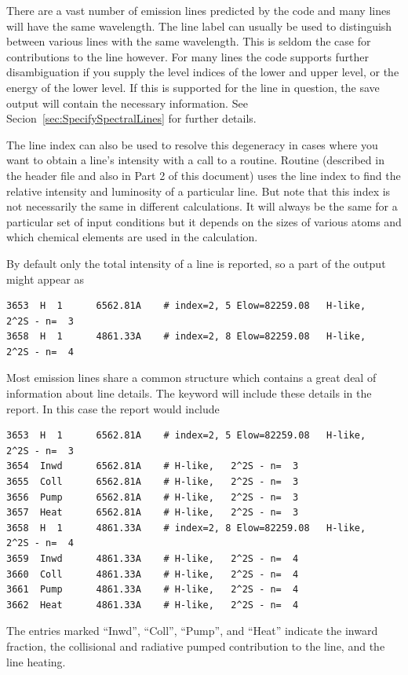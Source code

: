 There are a vast number of emission lines predicted by the code and many
lines will have the same wavelength.  The line label can usually be used
to distinguish between various lines with the same wavelength. This is seldom
the case for contributions to the line however.  For many lines the code
supports further disambiguation if you supply the level indices of the lower
and upper level, or the energy of the lower level.  If this is supported for
the line in question, the save output will contain the necessary information.
See Secion~\ref{sec:SpecifySpectralLines} for further details.

The line index can also be used
to resolve this degeneracy in cases where you want to obtain a line's
intensity with a call to a routine.
Routine  (described in the
header file  and also in Part 2 of this document)
uses the line index to find the relative intensity and
luminosity of a particular line.
But note that this index is not necessarily the same in different
calculations.  It will always be the same for a particular set of input
conditions but it depends on the sizes of various atoms and which chemical
elements are used in the calculation.

By default only the total intensity of a line is reported, so a
part of the output might appear as
\begin{verbatim}
3653  H  1      6562.81A    # index=2, 5 Elow=82259.08   H-like,   2^2S - n=  3
3658  H  1      4861.33A    # index=2, 8 Elow=82259.08   H-like,   2^2S - n=  4
\end{verbatim}

Most emission lines share a common structure which contains a
great deal of information about line details.  The keyword  
will include these details in the report.  In this case
the report would include
\begin{verbatim}
3653  H  1      6562.81A    # index=2, 5 Elow=82259.08   H-like,   2^2S - n=  3
3654  Inwd      6562.81A    # H-like,   2^2S - n=  3
3655  Coll      6562.81A    # H-like,   2^2S - n=  3
3656  Pump      6562.81A    # H-like,   2^2S - n=  3
3657  Heat      6562.81A    # H-like,   2^2S - n=  3
3658  H  1      4861.33A    # index=2, 8 Elow=82259.08   H-like,   2^2S - n=  4
3659  Inwd      4861.33A    # H-like,   2^2S - n=  4
3660  Coll      4861.33A    # H-like,   2^2S - n=  4
3661  Pump      4861.33A    # H-like,   2^2S - n=  4
3662  Heat      4861.33A    # H-like,   2^2S - n=  4
\end{verbatim}
The entries marked ``Inwd'', ``Coll'', ``Pump'', and ``Heat'' indicate
the inward fraction, the collisional and radiative pumped contribution to
the line, and the line heating.  

